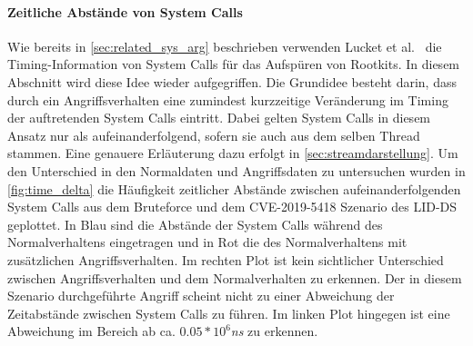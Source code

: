                 \paragraph{Zeitliche Abstände von System Calls}
                    Wie bereits in \autoref{sec:related_sys_arg} beschrieben verwenden Lucket et al.~\cite{TIMINGLUCKETT2016} die Timing-Information von System Calls für das Aufspüren von Rootkits.
                    In diesem Abschnitt wird diese Idee wieder aufgegriffen.
                    Die Grundidee besteht darin, dass durch ein Angriffsverhalten eine zumindest kurzzeitige Veränderung im Timing der auftretenden System Calls eintritt.
                    Dabei gelten System Calls in diesem Ansatz nur als aufeinanderfolgend, sofern sie auch aus dem selben Thread stammen.
                    Eine genauere Erläuterung dazu erfolgt in \autoref{sec:streamdarstellung}.
                    Um den Unterschied in den Normaldaten und Angriffsdaten zu untersuchen wurden in \autoref{fig:time_delta} die Häufigkeit zeitlicher Abstände zwischen aufeinanderfolgenden System Calls aus dem Bruteforce und dem CVE-2019-5418 Szenario des \ac{LID-DS} geplottet.
                    In Blau sind die Abstände der System Calls während des Normalverhaltens eingetragen und in Rot die des Normalverhaltens mit zusätzlichen Angriffsverhalten.
                    Im rechten Plot ist kein sichtlicher Unterschied zwischen Angriffsverhalten und dem Normalverhalten zu erkennen.
                    Der in diesem Szenario durchgeführte Angriff scheint nicht zu einer Abweichung der Zeitabstände zwischen System Calls zu führen.
                    Im linken Plot hingegen ist eine Abweichung im Bereich ab ca. $0.05*10^{6}$\textit{ns} zu erkennen.

